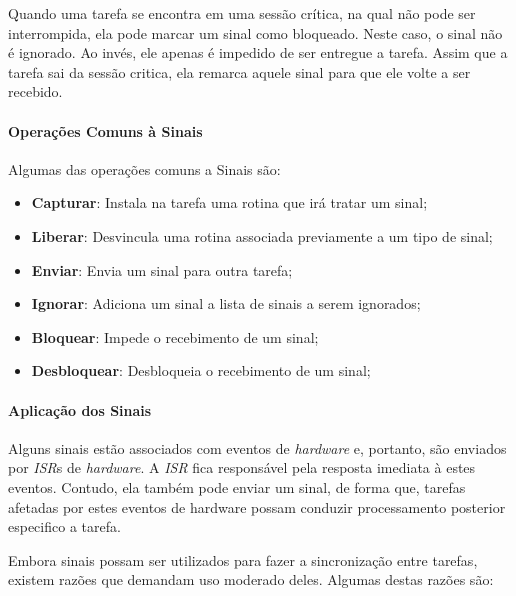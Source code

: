 Quando uma tarefa se encontra em uma sessão crítica, na qual não pode ser interrompida, ela pode marcar um sinal como bloqueado. Neste caso, o sinal não é ignorado. Ao invés, ele apenas é impedido de ser entregue a tarefa. Assim que a tarefa sai da sessão critica, ela remarca aquele sinal para que ele volte a ser recebido.

\paragraph{Operações Comuns à Sinais}

Algumas das operações comuns a Sinais são:

\begin{itemize}
	\item \textbf{Capturar}: Instala na tarefa uma rotina que irá tratar um sinal;
	\item \textbf{Liberar}: Desvincula uma rotina associada previamente a um tipo de sinal;
	\item \textbf{Enviar}: Envia um sinal para outra tarefa;
	\item \textbf{Ignorar}: Adiciona um sinal a lista de sinais a serem ignorados;
	\item \textbf{Bloquear}: Impede o recebimento de um sinal;
	\item \textbf{Desbloquear}: Desbloqueia o recebimento de um sinal;
\end{itemize}

\paragraph{Aplicação dos Sinais}

Alguns sinais estão associados com eventos de \emph{hardware} e, portanto, são enviados por \emph{ISR}s de \emph{hardware}. A \emph{ISR} fica responsável pela resposta imediata à estes eventos. Contudo, ela também pode enviar um sinal, de forma que, tarefas afetadas por estes eventos de hardware possam conduzir processamento posterior especifico a tarefa.

Embora sinais possam ser utilizados para fazer a sincronização entre tarefas, existem razões que demandam uso moderado deles. Algumas destas razões são:

